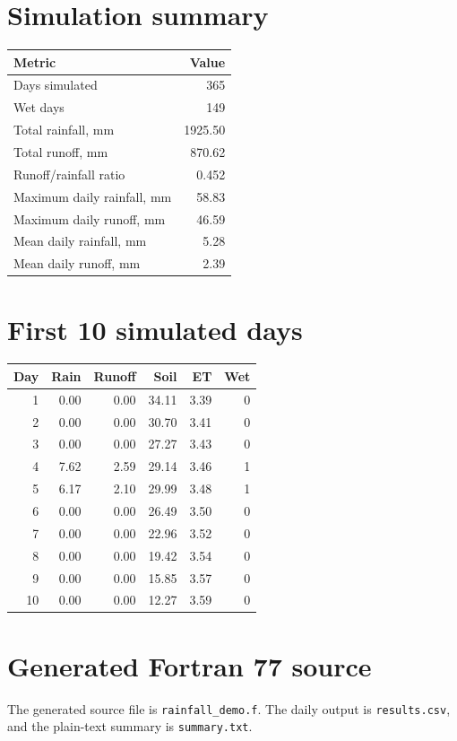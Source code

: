 \documentclass[11pt]{article}
\begin{document}
\section*{Simulation summary}
\begin{center}
\begin{tabular}{lr}
\toprule
Metric & Value \\
\midrule
Days simulated & 365 \\
Wet days & 149 \\
Total rainfall, mm & 1925.50 \\
Total runoff, mm & 870.62 \\
Runoff/rainfall ratio & 0.452 \\
Maximum daily rainfall, mm & 58.83 \\
Maximum daily runoff, mm & 46.59 \\
Mean daily rainfall, mm & 5.28 \\
Mean daily runoff, mm & 2.39 \\
\bottomrule
\end{tabular}
\end{center}

\section*{First 10 simulated days}
\begin{center}
\begin{tabular}{rrrrrr}
\toprule
Day & Rain & Runoff & Soil & ET & Wet \\
\midrule
1 & 0.00 & 0.00 & 34.11 & 3.39 & 0 \\
2 & 0.00 & 0.00 & 30.70 & 3.41 & 0 \\
3 & 0.00 & 0.00 & 27.27 & 3.43 & 0 \\
4 & 7.62 & 2.59 & 29.14 & 3.46 & 1 \\
5 & 6.17 & 2.10 & 29.99 & 3.48 & 1 \\
6 & 0.00 & 0.00 & 26.49 & 3.50 & 0 \\
7 & 0.00 & 0.00 & 22.96 & 3.52 & 0 \\
8 & 0.00 & 0.00 & 19.42 & 3.54 & 0 \\
9 & 0.00 & 0.00 & 15.85 & 3.57 & 0 \\
10 & 0.00 & 0.00 & 12.27 & 3.59 & 0 \\
\bottomrule
\end{tabular}
\end{center}

\section*{Generated Fortran 77 source}
The generated source file is \texttt{rainfall\_demo.f}. The daily output is
\texttt{results.csv}, and the plain-text summary is \texttt{summary.txt}.


\end{document}
